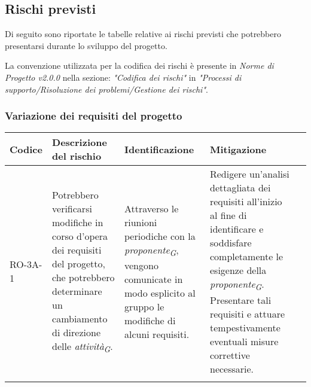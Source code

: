 \subsection{Rischi previsti}
Di seguito sono riportate le tabelle relative ai rischi previsti che potrebbero presentarsi durante lo sviluppo del progetto.  

La convenzione utilizzata per la codifica dei rischi è presente in \textit{Norme di Progetto v2.0.0} nella sezione: \textit{"Codifica dei rischi"} in \textit{"Processi di supporto/Risoluzione dei problemi/Gestione dei rischi"}.  

\subsubsection{Variazione dei requisiti del progetto}
\begin{table}[H]
    \centering
    \begin{tabularx}{\textwidth}{l>{\RaggedRight}X>{\RaggedRight}X>{\RaggedRight}X>{\RaggedRight}X}
    \toprule
    \rowcolor{gray!50}
    \textbf{Codice} & \textbf{Descrizione del rischio} & \textbf{Identificazione} & \textbf{Mitigazione} \\
    \midrule
    \addlinespace 
    RO-3A-1 & 
    Potrebbero verificarsi modifiche in corso d'opera dei requisiti del progetto, che potrebbero determinare un cambiamento di direzione delle \textit{attività}\textsubscript{\textit{G}}. &
    Attraverso le riunioni periodiche con la \textit{proponente}\textsubscript{\textit{G}}, vengono comunicate in modo esplicito al gruppo le modifiche di alcuni requisiti. &
    Redigere un'analisi dettagliata dei requisiti all'inizio al fine di identificare e soddisfare completamente le esigenze della \textit{proponente}\textsubscript{\textit{G}}. Presentare tali requisiti e attuare tempestivamente eventuali misure correttive necessarie.\\
    \bottomrule
    \addlinespace 
    \end{tabularx}
\end{table}

\vspace{2cm}

